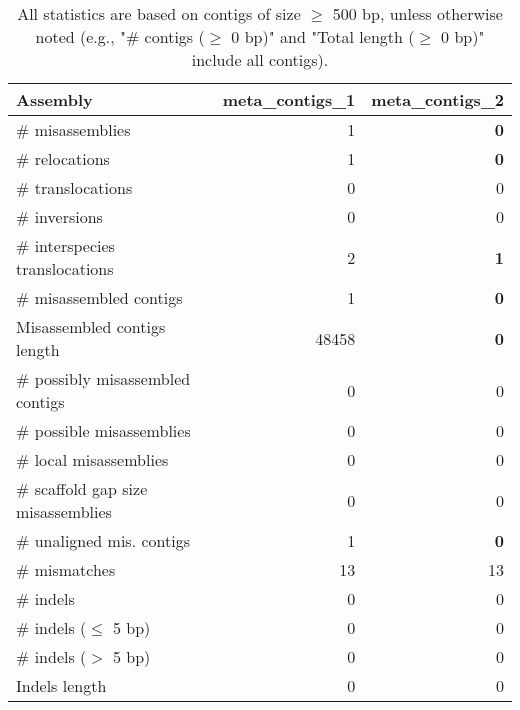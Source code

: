 \documentclass[12pt,a4paper]{article}
\begin{document}
\begin{table}[ht]
\begin{center}
\caption{All statistics are based on contigs of size $\geq$ 500 bp, unless otherwise noted (e.g., "\# contigs ($\geq$ 0 bp)" and "Total length ($\geq$ 0 bp)" include all contigs).}
\begin{tabular}{|l*{2}{|r}|}
\hline
Assembly & meta\_contigs\_1 & meta\_contigs\_2 \\ \hline
\# misassemblies & 1 & {\bf 0} \\ \hline
\hspace{5mm}\# relocations & 1 & {\bf 0} \\ \hline
\hspace{5mm}\# translocations & 0 & 0 \\ \hline
\hspace{5mm}\# inversions & 0 & 0 \\ \hline
\hspace{5mm}\# interspecies translocations & 2 & {\bf 1} \\ \hline
\# misassembled contigs & 1 & {\bf 0} \\ \hline
Misassembled contigs length & 48458 & {\bf 0} \\ \hline
\# possibly misassembled contigs & 0 & 0 \\ \hline
\hspace{5mm}\# possible misassemblies & 0 & 0 \\ \hline
\# local misassemblies & 0 & 0 \\ \hline
\# scaffold gap size misassemblies & 0 & 0 \\ \hline
\# unaligned mis. contigs & 1 & {\bf 0} \\ \hline
\# mismatches & 13 & 13 \\ \hline
\# indels & 0 & 0 \\ \hline
\hspace{5mm}\# indels ($\leq$ 5 bp) & 0 & 0 \\ \hline
\hspace{5mm}\# indels ($>$ 5 bp) & 0 & 0 \\ \hline
Indels length & 0 & 0 \\ \hline
\end{tabular}
\end{center}
\end{table}
\end{document}
